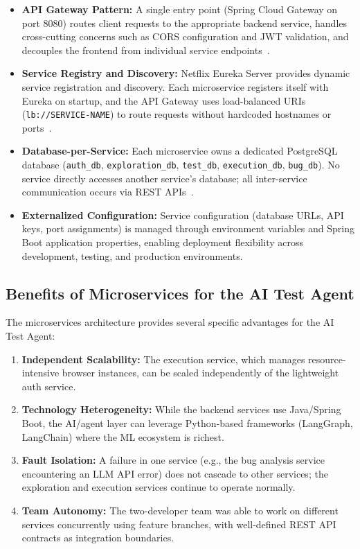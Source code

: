\begin{itemize}[nosep]
  \item \textbf{API Gateway Pattern:} A single entry point (Spring Cloud
        Gateway on port 8080) routes client requests to the appropriate
        backend service, handles cross-cutting concerns such as CORS
        configuration and JWT validation, and decouples the frontend
        from individual service endpoints~\cite{newman2021microservices}.
  \item \textbf{Service Registry and Discovery:} Netflix Eureka Server
        provides dynamic service registration and discovery. Each
        microservice registers itself with Eureka on startup, and the
        API Gateway uses load-balanced URIs (\texttt{lb://SERVICE-NAME})
        to route requests without hardcoded hostnames or
        ports~\cite{fowler2014microservices}.
  \item \textbf{Database-per-Service:} Each microservice owns a dedicated
        PostgreSQL database (\texttt{auth\_db}, \texttt{exploration\_db},
        \texttt{test\_db}, \texttt{execution\_db}, \texttt{bug\_db}).
        No service directly accesses another service's database; all
        inter-service communication occurs via REST
        APIs~\cite{newman2021microservices}.
  \item \textbf{Externalized Configuration:} Service configuration
        (database URLs, API keys, port assignments) is managed through
        environment variables and Spring Boot application properties,
        enabling deployment flexibility across development, testing,
        and production environments.
\end{itemize}

\subsection{Benefits of Microservices for the AI Test Agent}
\label{subsec:microservices_benefits}

The microservices architecture provides several specific advantages for
the AI Test Agent:

\begin{enumerate}[nosep]
  \item \textbf{Independent Scalability:} The execution service, which
        manages resource-intensive browser instances, can be scaled
        independently of the lightweight auth service.
  \item \textbf{Technology Heterogeneity:} While the backend services
        use Java/Spring Boot, the AI/agent layer can leverage Python-based
        frameworks (LangGraph, LangChain) where the ML ecosystem is
        richest.
  \item \textbf{Fault Isolation:} A failure in one service (e.g., the
        bug analysis service encountering an LLM API error) does not
        cascade to other services; the exploration and execution services
        continue to operate normally.
  \item \textbf{Team Autonomy:} The two-developer team was able to work
        on different services concurrently using feature branches, with
        well-defined REST API contracts as integration boundaries.
\end{enumerate}

